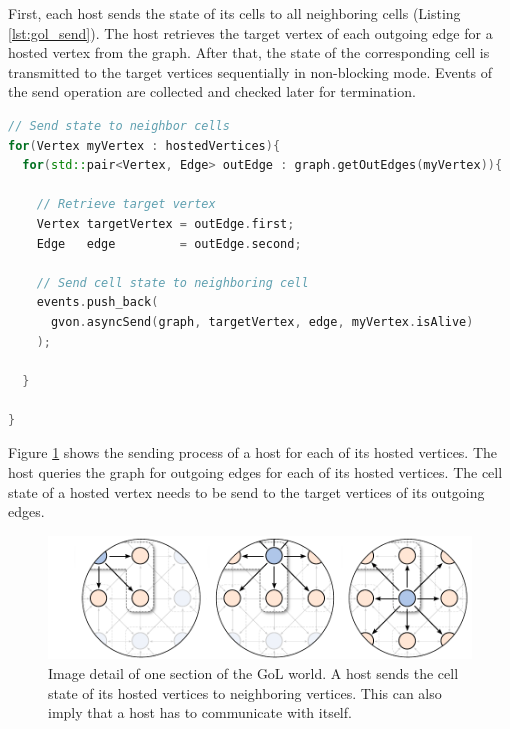 First, each host sends the state of its cells to all neighboring
cells (Listing \ref{lst:gol_send}). The host retrieves the target
vertex of each outgoing edge for a hosted vertex from the graph. After that,
the state of the corresponding cell is transmitted to the target vertices
sequentially in non-blocking mode. Events of the send operation are
collected and checked later for termination.

\begin{minipage}[t]{\textwidth} 
\begin{lstlisting}[language=C++, label=lst:gol_send, caption={A host sends the cell state of its hosted vertices to all neighboring vertices. The information of neighboring vertices is retrieved from the graph. The cell states are send in the non-blocking variant.}]
// Send state to neighbor cells
for(Vertex myVertex : hostedVertices){
  for(std::pair<Vertex, Edge> outEdge : graph.getOutEdges(myVertex)){

    // Retrieve target vertex
    Vertex targetVertex = outEdge.first;
    Edge   edge         = outEdge.second;

    // Send cell state to neighboring cell
    events.push_back(
      gvon.asyncSend(graph, targetVertex, edge, myVertex.isAlive)
    );

  }

}
\end{lstlisting}
\end{minipage}

\noindent Figure \ref{fig:gol_communication} shows the sending process
of a host for each of its hosted vertices. The host queries the graph
for outgoing edges for each of its hosted vertices. The cell state of
a hosted vertex needs to be send to the target vertices of its outgoing
edges.

\begin{figure}[H]
  \centering
  \includegraphics[width=\textwidth]{graphics/40_gol_communication}
  \caption{Image detail of one section of the GoL world. A host sends
    the cell state of its hosted vertices to neighboring
    vertices. This can also imply that a host has to communicate with
    itself.}
  \label{fig:gol_communication}
\end{figure}

